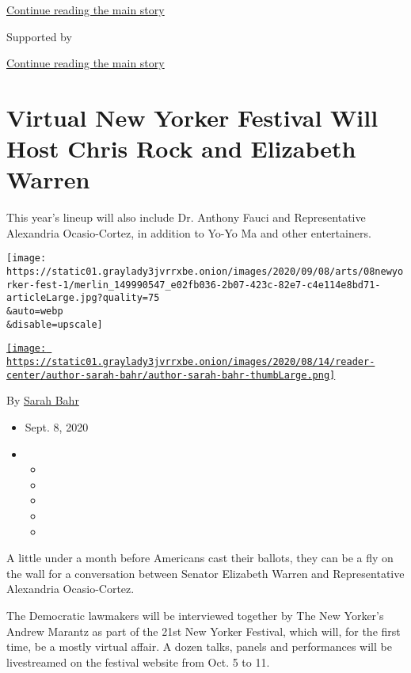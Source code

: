 \protect\hyperlink{after-top}{Continue reading the main story}

Supported by

\protect\hyperlink{after-sponsor}{Continue reading the main story}

\hypertarget{virtual-new-yorker-festival-will-host-chris-rock-and-elizabeth-warren}{%
\section{Virtual New Yorker Festival Will Host Chris Rock and Elizabeth
Warren}\label{virtual-new-yorker-festival-will-host-chris-rock-and-elizabeth-warren}}

This year's lineup will also include Dr. Anthony Fauci and
Representative Alexandria Ocasio-Cortez, in addition to Yo-Yo Ma and
other entertainers.

\texttt{[image: https://static01.graylady3jvrrxbe.onion/images/2020/09/08/arts/08newyorker-fest-1/merlin\_149990547\_e02fb036-2b07-423c-82e7-c4e114e8bd71-articleLarge.jpg?quality=75\\\&auto=webp\\\&disable=upscale]}

\href{https://www.nytimes3xbfgragh.onion/by/sarah-bahr}{\texttt{[image: https://static01.graylady3jvrrxbe.onion/images/2020/08/14/reader-center/author-sarah-bahr/author-sarah-bahr-thumbLarge.png]}}

By \href{https://www.nytimes3xbfgragh.onion/by/sarah-bahr}{Sarah Bahr}

\begin{itemize}
\item
  Sept. 8, 2020
\item
  \begin{itemize}
  \item
  \item
  \item
  \item
  \item
  \end{itemize}
\end{itemize}

A little under a month before Americans cast their ballots, they can be
a fly on the wall for a conversation between Senator Elizabeth Warren
and Representative Alexandria Ocasio-Cortez.

The Democratic lawmakers will be interviewed together by The New
Yorker's Andrew Marantz as part of the 21st New Yorker Festival, which
will, for the first time, be a mostly virtual affair. A dozen talks,
panels and performances will be livestreamed on the festival website
from Oct. 5 to 11.

